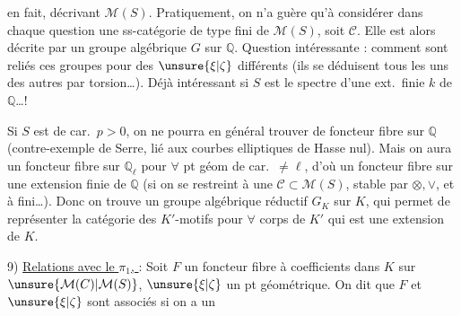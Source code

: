 en fait,  décrivant $\mathcal{M}(S)$.
Pratiquement, on n'a guère qu'à considérer dans  chaque question une ss-catégorie de type fini de $\mathcal{M}(S)$, soit $\mathcal C$. Elle est alors décrite par un  groupe algébrique  $G$ sur $\mathbb{Q}$.
Question intéressante : comment sont reliés ces groupes pour des $\unsure{\xi|\zeta}$ différents (ils se déduisent tous les uns des autres par torsion\dots).
Déjà intéressant si $S$ est le spectre d'une ext.\ finie $k$ de $\mathbb{Q}$\dots!

Si $S$ est de car.\ $p>0$, on ne pourra en général trouver de foncteur fibre sur $\mathbb{Q}$ (contre-exemple de Serre, lié aux courbes elliptiques de Hasse nul).
Mais on aura un foncteur fibre sur $\mathbb{Q}_\ell$ pour $\forall$ pt géom de car.\ $\ne\ell$, d'où un foncteur fibre sur une extension finie  de $\mathbb{Q}$ (si on se restreint à une $\mathcal C\subset \mathcal{M}(S)$, stable par  $\otimes,\vee$, et à  fini\dots).
Donc on trouve un groupe algébrique réductif $G_K$ sur $K$, qui permet de représenter la catégorie des $K'$-motifs pour $\forall$ corps de  $K'$ qui est une extension de $K$.

9) \uline{Relations avec le $\pi_1$, } :
Soit $F$ un foncteur fibre à coefficients dans $K$ sur $\unsure{\mathcal{M}(C)|\mathcal{M}(S)}$,
$\unsure{\xi|\zeta}$ un pt géométrique. On dit que $F$ et $\unsure{\xi|\zeta}$ sont associés si on a un 

